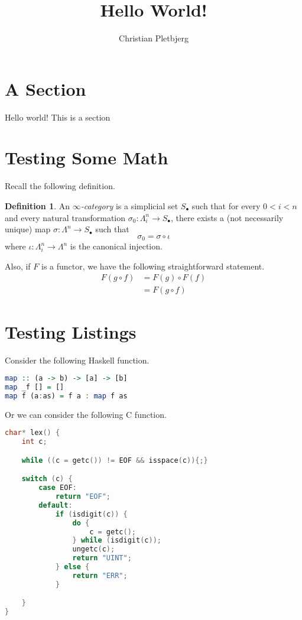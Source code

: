 \documentclass{article}
\title{Hello World!}
\author{Christian Pletbjerg}
\theoremstyle{plain}%
\theoremstyle{definition}
\newtheorem{defn}{Definition}[section]
\theoremstyle{remark}
\begin{document}
\maketitle

\tableofcontents

\section{A Section}
Hello world! This is a section

\section{Testing Some Math}
Recall the following definition.
\begin{defn}
    An \emph{$\infty$-category} is a simplicial set $S_\bullet$ such that
    for every $ 0 < i < n$ and every natural transformation $\sigma_0 : \Lambda^n_i \to S_\bullet$, there exists a (not necessarily unique) map $\sigma : \Lambda^n \to S_\bullet$
    such that
    \[
        \sigma_0 = \sigma \circ \iota
    \]
    where $\iota : \Lambda^n_i \to \Lambda^n$ is the canonical injection.
\end{defn}

Also, if $F$ is a functor, we have the following straightforward statement.
\[
\begin{aligned}
    F( g \circ f ) 
        &=  F( g ) \circ F (f ) \\
        &=  F( g \circ f ) 
\end{aligned}
\]

\section{Testing Listings}
Consider the following Haskell function.
\begin{lstlisting}[language=Haskell]
map :: (a -> b) -> [a] -> [b]
map _f [] = []
map f (a:as) = f a : map f as
\end{lstlisting}

Or we can consider the following C function.
\begin{lstlisting}[language=C]
char* lex() {
    int c; 

    while ((c = getc()) != EOF && isspace(c)){;}

    switch (c) {
        case EOF:
            return "EOF";
        default:
            if (isdigit(c)) {
                do {
                    c = getc();
                } while (isdigit(c));
                ungetc(c);
                return "UINT";
            } else {
                return "ERR";
            }

    }
}
\end{lstlisting}
\end{document}
